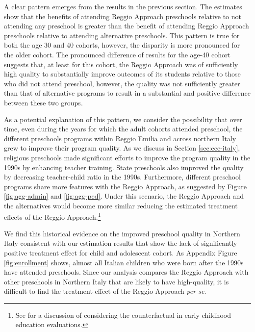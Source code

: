 A clear pattern emerges from the results in the previous section. The estimates show that the benefits of attending Reggio Approach preschools relative to not attending any preschool is greater than the benefit of attending Reggio Approach preschools relative to attending alternative preschools. This pattern is true for both the age 30 and 40 cohorts, however, the disparity is more pronounced for the older cohort. The pronounced difference of results for the age-40 cohort suggests that, at least for this cohort, the Reggio Approach was of sufficiently high quality to substantially improve outcomes of its students relative to those who did not attend preschool, however, the quality was not sufficiently greater than that of alternative programs to result in a substantial and positive difference between these two groups.

As a potential explanation of this pattern, we consider the possibility that over time, even during the years for which the adult cohorts attended preschool, the different preschools programs within Reggio Emilia and across northern Italy grew to improve their program quality. As we discuss in Section \ref{sec:ece-italy}, religious preschools made significant efforts to improve the program quality in the 1990s by enhancing teacher training. State preschools also improved the quality by decreasing teacher-child ratio in the 1990s. Furthermore, different preschool programs share more features with the Reggio Approach, as suggested by Figure \ref{fig:agg-admin} and \ref{fig:agg-ped}. Under this scenario, the Reggio Approach and the alternatives would become more similar reducing the estimated treatment effects of the Reggio Approach.\footnote{See \citet{Elango_Hojman_etal_2016_Early-Edu} for a discussion of considering the counterfactual in early childhood education evaluations.} 

We find this historical evidence on the improved preschool quality in Northern Italy consistent with our estimation results that show the lack of significantly positive treatment effect for child and adolescent cohort. As Appendix Figure \ref{fig:enrollment} shows, almost all Italian children who were born after the 1990s have attended preschools. Since our analysis compares the Reggio Approach with other preschools in Northern Italy that are likely to have high-quality, it is difficult to find the treatment effect of the Reggio Approach \textit{per se}. 



